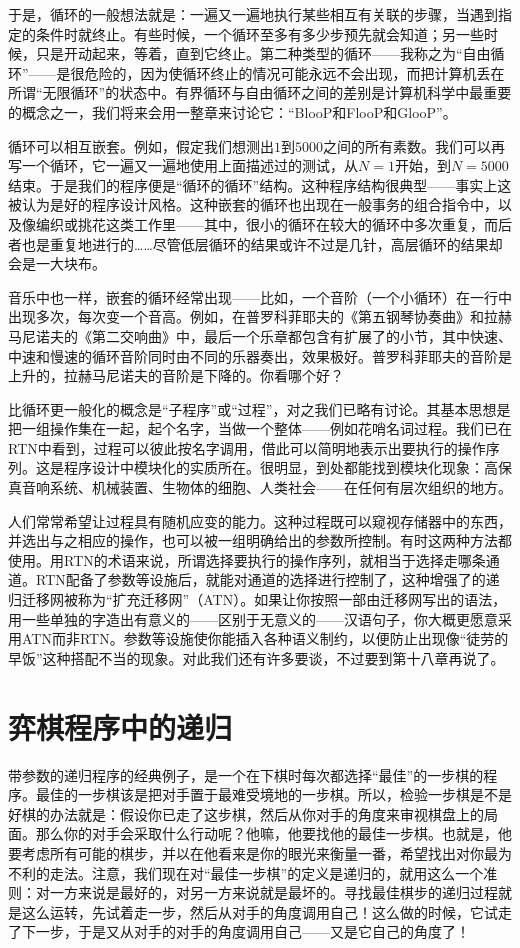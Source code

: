 于是，循环的一般想法就是：一遍又一遍地执行某些相互有关联的步骤，当遇到指定的条件时就终止。有些时候，一个循环至多有多少步预先就会知道；另一些时候，只是开动起来，等着，直到它终止。第二种类型的循环——我称之为“自由循环”——是很危险的，因为使循环终止的情况可能永远不会出现，而把计算机丢在所谓“无限循环”的状态中。有界循环与自由循环之间的差别是计算机科学中最重要的概念之一，我们将来会用一整章来讨论它：“BlooP和FlooP和GlooP”。

循环可以相互嵌套。例如，假定我们想测出$1$到$5000$之间的所有素数。我们可以再写一个循环，它一遍又一遍地使用上面描述过的测试，从$N=1$开始，到$N=5000$结束。于是我们的程序便是“循环的循环”结构。这种程序结构很典型——事实上这被认为是好的程序设计风格。这种嵌套的循环也出现在一般事务的组合指令中，以及像编织或挑花这类工作里——其中，很小的循环在较大的循环中多次重复，而后者也是重复地进行的……尽管低层循环的结果或许不过是几针，高层循环的结果却会是一大块布。

音乐中也一样，嵌套的循环经常出现——比如，一个音阶（一个小循环）在一行中出现多次，每次变一个音高。例如，在普罗科菲耶夫的《第五钢琴协奏曲》和拉赫马尼诺夫的《第二交响曲》中，最后一个乐章都包含有扩展了的小节，其中快速、中速和慢速的循环音阶同时由不同的乐器奏出，效果极好。普罗科菲耶夫的音阶是上升的，拉赫马尼诺夫的音阶是下降的。你看哪个好？

比循环更一般化的概念是“子程序”或“过程”，对之我们已略有讨论。其基本思想是把一组操作集在一起，起个名字，当做一个整体——例如花哨名词过程。我们已在RTN中看到，过程可以彼此按名字调用，借此可以简明地表示出要执行的操作序列。这是程序设计中模块化的实质所在。很明显，到处都能找到模块化现象：高保真音响系统、机械装置、生物体的细胞、人类社会——在任何有层次组织的地方。

人们常常希望让过程具有随机应变的能力。这种过程既可以窥视存储器中的东西，并选出与之相应的操作，也可以被一组明确给出的参数所控制。有时这两种方法都使用。用RTN的术语来说，所谓选择要执行的操作序列，就相当于选择走哪条通道。RTN配备了参数等设施后，就能对通道的选择进行控制了，这种增强了的递归迁移网被称为“扩充迁移网”（ATN）。如果让你按照一部由迁移网写出的语法，用一些单独的字造出有意义的——区别于无意义的——汉语句子，你大概更愿意采用ATN而非RTN。参数等设施使你能插入各种语义制约，以便防止出现像“徒劳的早饭”这种搭配不当的现象。对此我们还有许多要谈，不过要到第十八章再说了。

\section{弈棋程序中的递归}

带参数的递归程序的经典例子，是一个在下棋时每次都选择“最佳”的一步棋的程序。最佳的一步棋该是把对手置于最难受境地的一步棋。所以，检验一步棋是不是好棋的办法就是：假设你已走了这步棋，然后从你对手的角度来审视棋盘上的局面。那么你的对手会采取什么行动呢？他嘛，他要找他的最佳一步棋。也就是，他要考虑所有可能的棋步，并以在他看来是你的眼光来衡量一番，希望找出对你最为不利的走法。注意，我们现在对“最佳一步棋”的定义是递归的，就用这么一个准则：对一方来说是最好的，对另一方来说就是最坏的。寻找最佳棋步的递归过程就是这么运转，先试着走一步，然后从对手的角度调用自己！这么做的时候，它试走了下一步，于是又从对手的对手的角度调用自己——又是它自己的角度了！

